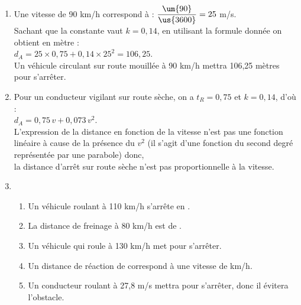 \ \\ [-5mm]
   \begin{enumerate}
      \item Une vitesse de 90 km/h correspond à : $\dfrac{\um{90}}{\us{3600}} =25$ m/s. \\ [1mm]
         Sachant que la constante vaut $k =0,14$, en utilisant la formule donnée on obtient en mètre : \\
         $d_A =25\times0,75+0,14\times25^2 =106,25$. \\
         {\blue Un véhicule circulant sur route mouillée à 90 km/h mettra 106,25 mètres pour s'arrêter}. \\
      \item Pour un conducteur vigilant sur route sèche, on a $t_R =0,75$ et $k =0,14$, d'où : \\
   $d_A =0,75\,v+0,073\,v^2$. \\
          L'expression de la distance en fonction de la vitesse n'est pas une fonction linéaire à cause de la présence du \og $v^2$ \fg{} (il s'agit d'une fonction du second degré représentée par une parabole) donc, \\
         {\blue la distance d'arrêt sur route sèche n'est pas proportionnelle à la vitesse.}
   \item
      \begin{enumerate}
          \item Un véhicule roulant à 110 km/h s'arrête en {\blue {}}.
          \item La distance de freinage à 80 km/h est de {\blue {}}.
          \item Un véhicule qui roule à 130 km/h met {\blue {}} pour s'arrêter.
          \item Un distance de réaction de  correspond à une vitesse de { km/h.}
          \item Un conducteur roulant à 27,8 m/s mettra  pour s'arrêter, donc {\blue il évitera l'obstacle}.
      \end{enumerate}
   \end{enumerate}

